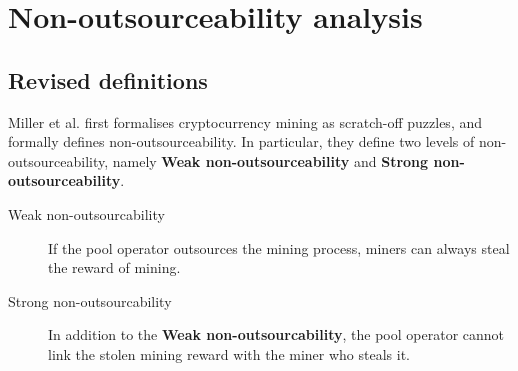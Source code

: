 \section{Non-outsourceability analysis}
\label{sec:non_outsourceability}



\subsection{Revised definitions}

Miller et al. \cite{miller2015nonoutsourceable} first formalises cryptocurrency mining as scratch-off puzzles, and formally defines non-outsourceability.
In particular, they define two levels of non-outsourceability, namely \textbf{Weak non-outsourceability} and \textbf{Strong non-outsourceability}.

\begin{description}
    \item[Weak non-outsourcability] If the pool operator outsources the mining process, miners can always steal the reward of mining.
    \item[Strong non-outsourcability] In addition to the \textbf{Weak non-outsourcability}, the pool operator cannot link the stolen mining reward with the miner who steals it.
\end{description}

